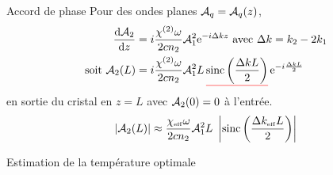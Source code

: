 \documentclass{beamer}
\newcommand{\chie}{\chi_\mathsc{eff}}
\newcommand{\dke}{\Delta k_\mathsc{eff}}
\begin{document}
\begin{frame}{Accord de phase}
Pour des ondes planes $\A_q = \A_q(z)$,
\begin{align*}
	\dv{\A_2}{z} &= i\frac{\chi^{(2)}\omega}{2cn_2} \A_1^2 \e{-i \Delta k z} \text{ avec } {\Delta k = k_2 - 2k_1} \label{eq:pwe} \\
	\text{soit } \A_2(L) &= i \frac{\chi^{(2)}\omega}{2 cn_2} \A_1^2 L\, \uline{red}{\operatorname{sinc}\left( \frac{\Delta k L}{2} \right)}\, \e{-i\frac{\Delta k L}{2}}
\end{align*}
en sortie du cristal en $z=L$ avec $\A_2(0)=0$ à l'entrée.
\begin{align*}
\left|\A_2(L)\right| \approx \frac{\chie\omega}{2 cn_2} \A_1^2 L\ \left|\operatorname{sinc}\left( \frac{\dke L}{2} \right)\right|
\end{align*}
\end{frame}

\begin{frame}{Estimation de la température optimale}
\centering


\end{frame}
\end{document}
